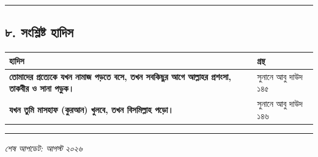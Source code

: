 \medskip\hrule\medskip

\subsection*{৮. সংশ্লিষ্ট হাদিস}

\begin{table}[h]\centering\small
\begin{tabular}{ll}
হাদিস & গ্রন্থ \\
\hline
\textbf{\lat{“}তোমাদের প্রত্যেকে যখন নামাজ পড়তে বসে, তখন সবকিছুর আগে আল্লাহর প্রশংসা, তাকবীর ও সানা পড়ুক।\lat{”}} & সুনানে আবু দাউদ ১৪৫ \\
\textbf{\lat{“}যখন তুমি মাসহাফ (কুরআন) খুলবে, তখন বিসমিল্লাহ পড়ো।\lat{”}} & সুনানে আবু দাউদ ১৪৬ \\
\hline
\end{tabular}
\end{table}

\medskip\hrule\medskip

\textit{শেষ আপডেট: আগস্ট ২০২৬}



